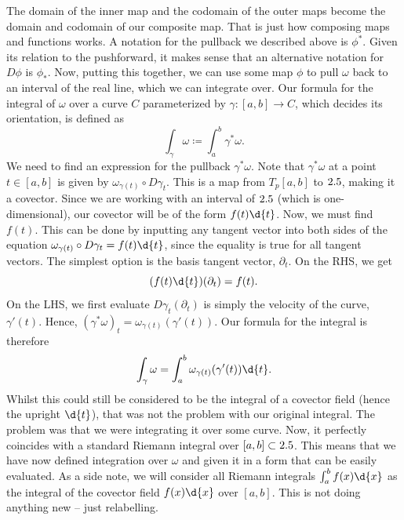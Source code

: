 \documentclass[a4paper,12pt]{article}
\begin{document}
The domain of the inner map and the codomain of the outer maps become the domain and codomain of our composite map.
That is just how composing maps and functions works.
A notation for the pullback we described above is $\phi^*$.
Given its relation to the pushforward, it makes sense that an alternative notation for $D\phi$ is $\phi_*$.
Now, putting this together, we can use some map $\phi$ to pull $\omega$ back to an interval of the real line, which we can integrate over.
Our formula for the integral of $\omega$ over a curve $C$ parameterized by $\gamma: [a,b] \to C$, which decides its orientation, is defined as
\begin{equation*}
    \int_\gamma \omega \coloneq \int_a^b \gamma^* \omega.
\end{equation*}
We need to find an expression for the pullback $\gamma^*\omega$.
Note that $\gamma^*\omega$ at a point $t \in [a,b]$ is given by $\omega_{\gamma(t)} \circ D\gamma_t$.
This is a map from $T_p[a,b]$ to $2.5$, making it a covector.
Since we are working with an interval of $2.5$ (which is one-dimensional), our covector will be of the form $f(t) \d{t}$.
Now, we must find $f(t)$.
This can be done by inputting any tangent vector into both sides of the equation $\omega_{\gamma(t)} \circ D\gamma_t = f(t) \d{t}$, since the equality is true for all tangent vectors.
The simplest option is the basis tangent vector, $\partial_t$.
On the RHS, we get
\begin{equation*}
    (f(t) \d{t})(\partial_t) = f(t).
\end{equation*}
On the LHS, we first evaluate $D\gamma_t(\partial_t)$ is simply the velocity of the curve, $\gamma'(t)$.
Hence, $(\gamma^*\omega)_t = \omega_{\gamma(t)}(\gamma'(t))$.
Our formula for the integral is therefore
\begin{equation*}
    \int_\gamma \omega = \int_{a}^{b} \omega_{\gamma(t)}(\gamma'(t)) \d{t}.
\end{equation*}
Whilst this could still be considered to be the integral of a covector field (hence the upright $\d{t}$), that was not the problem with our original integral.
The problem was that we were integrating it over some curve.
Now, it perfectly coincides with a standard Riemann integral over $[a,b] \subset 2.5$.
This means that we have now defined integration over $\omega$ and given it in a form that can be easily evaluated.
As a side note, we will consider all Riemann integrals $\int_a^b f(x) \d{x}$ as the integral of the covector field $f(x) \d{x}$ over $[a,b]$.
This is not doing anything new -- just relabelling.
\end{document}
